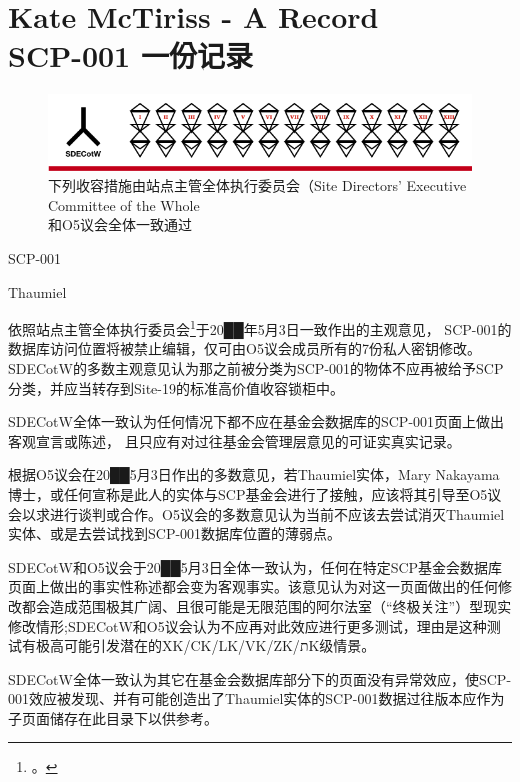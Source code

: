 \chapter[SCP-001 一份记录]{
	Kate McTiriss - A Record \\
	SCP-001 一份记录
}

\label{chap:SCP-001.a.record}

\begin{figure}[H]
	\centering
	\captionsetup{justification=centering}
	\includegraphics[width=\linewidth]{images/SCP.001.a.record.png}
	\caption*{下列收容措施由站点主管全体执行委员会（Site Directors' Executive Committee of the Whole\\ 和O5议会全体一致通过}
\end{figure}

SCP-001

Thaumiel

依照站点主管全体执行委员会\footnote{。}于20██年5月3日一致作出的主观意见， SCP-001的数据库访问位置将被禁止编辑，仅可由O5议会成员所有的7份私人密钥修改。SDECotW的多数主观意见认为那之前被分类为SCP-001的物体不应再被给予SCP分类，并应当转存到Site-19的标准高价值收容锁柜中。

SDECotW全体一致认为任何情况下都不应在基金会数据库的SCP-001页面上做出客观宣言或陈述， 且只应有对过往基金会管理层意见的可证实真实记录。

根据O5议会在20██5月3日作出的多数意见，若Thaumiel实体，Mary Nakayama博士，或任何宣称是此人的实体与SCP基金会进行了接触，应该将其引导至O5议会以求进行谈判或合作。O5议会的多数意见认为当前不应该去尝试消灭Thaumiel实体、或是去尝试找到SCP-001数据库位置的薄弱点。

SDECotW和O5议会于20██5月3日全体一致认为，任何在特定SCP基金会数据库页面上做出的事实性称述都会变为客观事实。该意见认为对这一页面做出的任何修改都会造成范围极其广阔、且很可能是无限范围的阿尔法室（“终极关注”）型现实修改情形;SDECotW和O5议会认为不应再对此效应进行更多测试，理由是这种测试有极高可能引发潜在的XK/CK/LK/VK/ZK/תK级情景。

SDECotW全体一致认为其它在基金会数据库部分下的页面没有异常效应，使SCP-001效应被发现、并有可能创造出了Thaumiel实体的SCP-001数据过往版本应作为子页面储存在此目录下以供参考。

